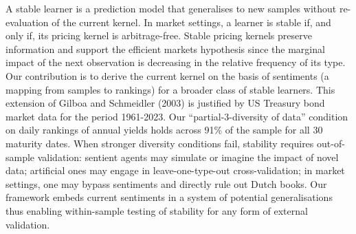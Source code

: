   A stable learner is a prediction model that generalises to new samples
  without re-evaluation of the current kernel.  In market settings, a learner
  is stable if, and only if, its pricing kernel is arbitrage-free.  Stable
  pricing kernels preserve information and support the efficient markets
  hypothesis since the marginal impact of the next observation is decreasing in
  the relative frequency of its type. Our contribution is to derive the current
  kernel on the basis of sentiments (a mapping from samples to rankings) for a
  broader class of stable learners. This extension of Gilboa and Schmeidler
  (2003) is justified by US Treasury bond market data for the period 1961-2023.
  Our ``partial-3-diversity of data'' condition on daily rankings of annual
  yields holds across 91\% of the sample for all 30 maturity dates. When
  stronger diversity conditions fail, stability requires out-of-sample
  validation: sentient agents may simulate or imagine the impact of novel data;
  artificial ones may engage in leave-one-type-out cross-validation; in market
  settings, one may bypass sentiments and directly rule out Dutch books. Our
  framework embeds current sentiments in a system of potential generalisations
  thus enabling within-sample testing of stability for any form of external
  validation.
%
